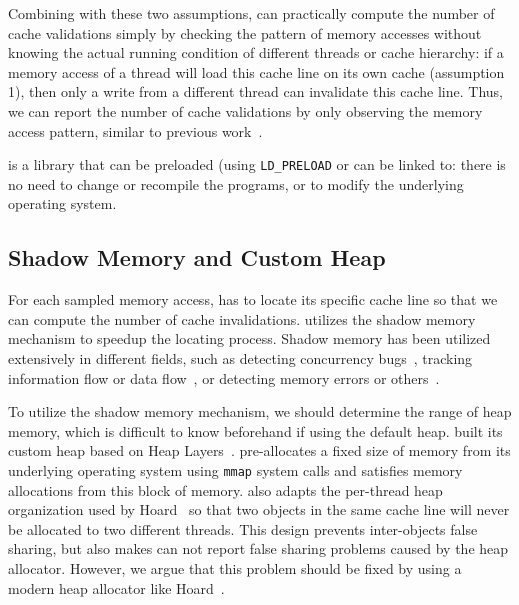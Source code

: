 Combining with these two assumptions, \cheetah{} can practically compute the number of cache validations simply by checking the pattern of memory accesses without knowing the actual running condition of different threads or cache hierarchy: if a memory access of a thread will load this cache line on its own cache (assumption 1), then only a write from a different thread can invalidate this cache line. Thus, we can report the number of cache validations by only observing the memory access pattern, similar to previous work~\cite{Predator, qinzhao}. 

\Cheetah{} is a library that can be preloaded (using \texttt{LD\_PRELOAD} or can be linked to: there is no need to change or recompile the programs, or to modify the underlying operating system. 

 

\subsection{Shadow Memory and Custom Heap}

For each sampled memory access, \cheetah{} has to locate its specific cache line so that we can compute the number of cache invalidations. \Cheetah{} utilizes the shadow memory mechanism to speedup the locating process. Shadow memory has been utilized extensively in different fields, such as detecting concurrency bugs~\cite{Harrow:2000:RCM:645880.672080, helgrind, 404681, Savage:1997:EDD:268998.266641}, tracking information flow or data flow~\cite{Cheng:2006:TEF:1157733.1157903, Newsome05dynamictaint, Qin:2006:LLP:1194816.1194834}, or detecting memory errors or others~\cite{qinzhao, Hastings91purify:fast, Seward:2005:UVD:1247360.1247362, Narayanasamy:2006:ALO:1140277.1140303}.  

To utilize the shadow memory mechanism, we should determine the range of heap memory, which is difficult to know beforehand if using the default heap. \cheetah{} built its custom heap based on Heap Layers~\cite{Berger:2001:CHM:378795.378821}. \cheetah{} pre-allocates a fixed size of memory
from its underlying operating system using \texttt{mmap} system calls and satisfies memory allocations from this block of memory. \cheetah{} also adapts the per-thread heap organization used by Hoard~\cite{Hoard} so that two objects in the same cache line will never be allocated to two different threads. This design prevents inter-objects false sharing, but also makes \cheetah{} can not report false sharing problems caused by the heap allocator.  However, we argue that this problem should be fixed by using a modern heap allocator like Hoard~\cite{Hoard}. 

